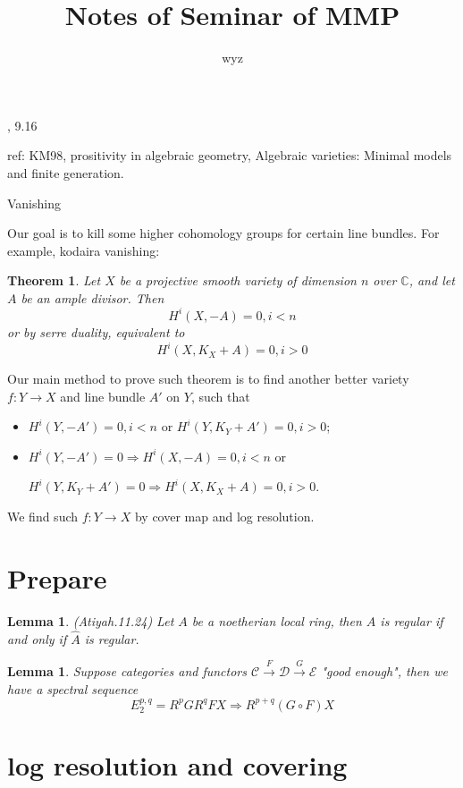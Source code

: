\documentclass{article}
\title{Notes of Seminar of MMP}
\author{wyz}
\date{}
\newtheorem{lem}[defn]{Lemma}
\newtheorem{thm}[defn]{Theorem}
\begin{document}
	, 9.16

ref: KM98, prositivity in algebraic geometry, Algebraic varieties: Minimal models and finite generation.

Vanishing	

Our goal is to kill some higher cohomology groups for certain line bundles. For example, kodaira vanishing: 

\begin{thm}
	Let $ X $ be a projective smooth variety of dimension $ n $ over $ \mathbb{C} $, and let  $ A $ be an ample divisor. Then
	$$ H^i(X,-A)=0,i<n $$
	or by serre duality, equivalent to
	$$ H^i(X,K_X+A)=0,i>0  $$
\end{thm}

Our main method to prove such theorem is to find another better variety $ f:Y\to X $ and line bundle $ A' $ on $ Y $, such that
\begin{itemize}
	\item $ H^i(Y,-A')=0,i<n  $ or $ H^i(Y,K_Y+A')=0,i>0  $;
	\item $ H^i(Y,-A')=0 \Rightarrow H^i(X,-A)=0,i<n  $  or
	
	$ H^i(Y,K_Y+A')=0 \Rightarrow  H^i(X,K_X+A)=0,i>0 $.
\end{itemize}
 We find such $ f:Y\to X $ by cover map and log resolution.

\section{Prepare}
\begin{lem}
	(Atiyah.11.24) Let $ A $ be a noetherian local ring, then $ A $ is regular if and only if $ \hat{A} $ is regular.
\end{lem}

\begin{lem}
	Suppose categories and functors $ \mathscr{C}\xrightarrow{F}\mathscr{D}\xrightarrow{G}\mathscr{E} $ "good enough", then we have a spectral sequence
	$$ E_2^{p,q}=R^pGR^qFX\Rightarrow R^{p+q}(G\circ F)X $$
\end{lem}
\section{log resolution and covering}
\end{document}
